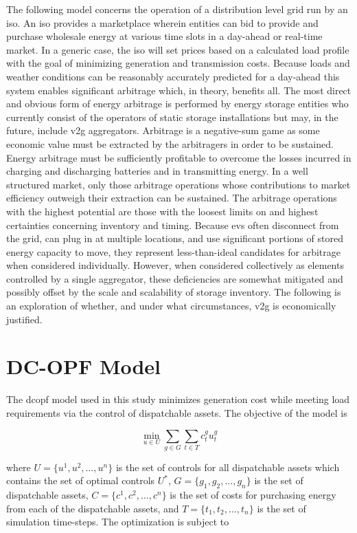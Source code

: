 \documentclass[12pt]{article}
\begin{document}
The following model concerns the operation of a distribution level grid run by an \gls{iso}. An \gls{iso} provides a marketplace wherein entities can bid to provide and purchase wholesale energy at various time slots in a day-ahead or real-time market. In a generic case, the \gls{iso} will set prices based on a calculated load profile with the goal of minimizing generation and transmission costs. Because loads and weather conditions can be reasonably accurately predicted for a day-ahead this system enables significant arbitrage which, in theory, benefits all. The most direct and obvious form of energy arbitrage is performed by energy storage entities who currently consist of the operators of static storage installations but may, in the future, include \gls{v2g} aggregators. Arbitrage is a negative-sum game as some economic value must be extracted by the arbitragers in order to be sustained. Energy arbitrage must be sufficiently profitable to overcome the losses incurred in charging and discharging batteries and in transmitting energy. In a well structured market, only those arbitrage operations whose contributions to market efficiency outweigh their extraction can be sustained. The arbitrage operations with the highest potential are those with the loosest limits on and highest certainties concerning inventory and timing. Because \glspl{ev} often disconnect from the grid, can plug in at multiple locations, and use significant portions of stored energy capacity to move, they represent less-than-ideal candidates for arbitrage when considered individually. However, when considered collectively as elements controlled by a single aggregator, these deficiencies are somewhat mitigated and possibly offset by the scale and scalability of storage inventory. The following is an exploration of whether, and under what circumstances, \gls{v2g} is economically justified.

\section*{DC-OPF Model}

The \gls{dcopf} model used in this study minimizes generation cost while meeting load requirements via the control of dispatchable assets. The objective of the model is

\begin{equation}
	\min_{u\in U}\sum_{g\in G}\sum_{t\in T} c^g_tu^g_t
\end{equation}

where $U=\{u^1, u^2, \dots, u^n\}$ is the set of controls for all dispatchable assets which contains the set of optimal controls $U^*$, $G=\{g_1, g_2, \dots, g_n\}$ is the set of dispatchable assets, $C=\{c^1, c^2, \dots, c^n\}$ is the set of costs for purchasing energy from each of the dispatchable assets, and $T=\{t_1, t_2, \dots, t_n\}$ is the set of simulation time-steps. The optimization is subject to



 
\end{document}
